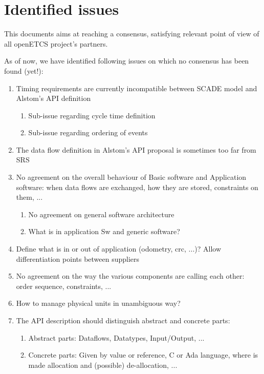 \section{Identified issues}

This documents aims at reaching a consensus, satisfying relevant point
of view of all openETCS project's partners.

As of now, we have identified following issues on which no consensus
has been found (yet!):
\begin{enumerate}
\item Timing requirements are currently incompatible between SCADE
  model and Alstom's API definition
  \begin{enumerate}
  \item 	Sub-issue regarding cycle time definition
  \item 	Sub-issue regarding ordering of events
  \end{enumerate}
\item The data flow definition in Alstom's API proposal is sometimes
  too far from SRS
\item No agreement on the overall behaviour of Basic software and
  Application software: when data flows are exchanged, how they are
  stored, constraints on them, ...
  \begin{enumerate}
  \item No agreement on general software architecture
  \item What is in application Sw and generic software?
  \end{enumerate}
\item Define what is in or out of application (odometry, crc, ...)?
  Allow differentiation points between suppliers
\item No agreement on the way the various components are calling each
  other: order sequence, constraints, ...
\item How to manage physical units in unambiguous way?
\item The API description should distinguish abstract and concrete
  parts:
  \begin{enumerate}
  \item Abstract parts: Dataflows, Datatypes, Input/Output, ...
  \item Concrete parts: Given by value or reference, C or Ada
    language, where is made allocation and (possible) de-allocation,
    ...
  \end{enumerate}
\end{enumerate}


